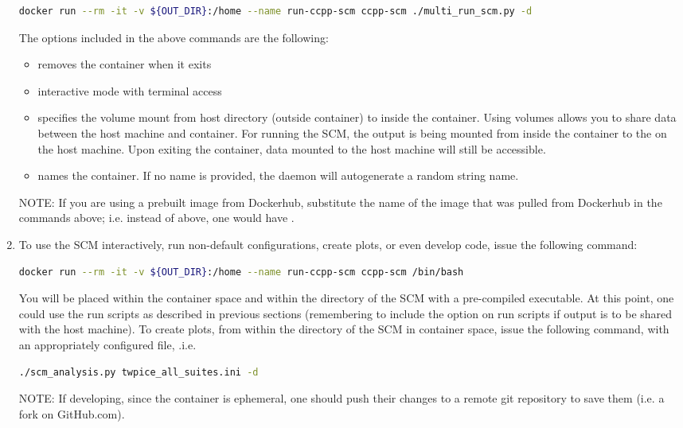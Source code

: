 \begin{enumerate}
\begin{lstlisting}[language=bash]
docker run --rm -it -v ${OUT_DIR}:/home --name run-ccpp-scm ccpp-scm ./multi_run_scm.py -d
\end{lstlisting}
The options included in the above  commands are the following:
\begin{itemize}
\item {} removes the container when it exits
\item {} interactive mode with terminal access
\item {} specifies the volume mount from host directory (outside container) to inside the container. Using volumes allows you to share data between the host machine and container. For running the SCM, the output is being mounted from  inside the container to the  on the host machine. Upon exiting the container, data mounted to the host machine will still be accessible.
\item {} names the container. If no name is provided, the daemon will autogenerate a random string name.
\end{itemize}
NOTE: If you are using a prebuilt image from Dockerhub, substitute the name of the image that was pulled from Dockerhub in the commands above; i.e. instead of  above, one would have .
\item To use the SCM interactively, run non-default configurations, create plots, or even develop code, issue the following command:
\begin{lstlisting}[language=bash]
docker run --rm -it -v ${OUT_DIR}:/home --name run-ccpp-scm ccpp-scm /bin/bash
\end{lstlisting}
You will be placed within the container space and within the  directory of the SCM with a pre-compiled executable. At this point, one could use the run scripts as described in previous sections (remembering to include the  option on run scripts if output is to be shared with the host machine). To create plots, from within the  directory of the SCM in container space, issue the following command, with an appropriately configured  file, .i.e.
\begin{lstlisting}[language=bash]
./scm_analysis.py twpice_all_suites.ini -d
\end{lstlisting}
NOTE: If developing, since the container is ephemeral, one should push their changes to a remote git repository to save them (i.e. a fork on GitHub.com).
\end{enumerate}
